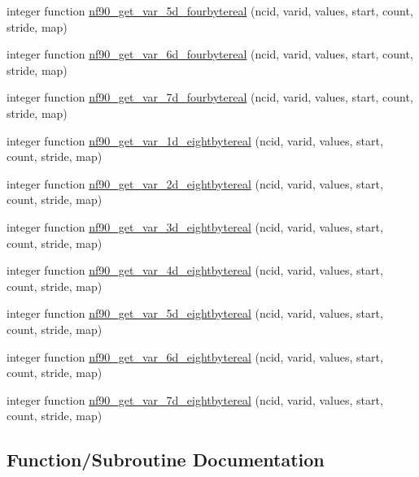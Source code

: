 \begin{DoxyCompactItemize}
\item 
integer function \hyperlink{netcdf__expanded_8f90_aa043d30c1a6946de0a1f3238599dc1ba}{nf90\+\_\+get\+\_\+var\+\_\+5d\+\_\+fourbytereal} (ncid, varid, values, start, count, stride, map)
\item 
integer function \hyperlink{netcdf__expanded_8f90_a4e533b8db3316390515ed2a7b07f571e}{nf90\+\_\+get\+\_\+var\+\_\+6d\+\_\+fourbytereal} (ncid, varid, values, start, count, stride, map)
\item 
integer function \hyperlink{netcdf__expanded_8f90_a7b7c4abd799cbfeebc5d7d8ccd84f484}{nf90\+\_\+get\+\_\+var\+\_\+7d\+\_\+fourbytereal} (ncid, varid, values, start, count, stride, map)
\item 
integer function \hyperlink{netcdf__expanded_8f90_aec28e5c121aacbc48876536b680239a1}{nf90\+\_\+get\+\_\+var\+\_\+1d\+\_\+eightbytereal} (ncid, varid, values, start, count, stride, map)
\item 
integer function \hyperlink{netcdf__expanded_8f90_a12e770f98fbe0667a092e830d92fcd08}{nf90\+\_\+get\+\_\+var\+\_\+2d\+\_\+eightbytereal} (ncid, varid, values, start, count, stride, map)
\item 
integer function \hyperlink{netcdf__expanded_8f90_a6303024b966f78850d884c5acb757da7}{nf90\+\_\+get\+\_\+var\+\_\+3d\+\_\+eightbytereal} (ncid, varid, values, start, count, stride, map)
\item 
integer function \hyperlink{netcdf__expanded_8f90_a49009223043fec3a6e56664363d34b28}{nf90\+\_\+get\+\_\+var\+\_\+4d\+\_\+eightbytereal} (ncid, varid, values, start, count, stride, map)
\item 
integer function \hyperlink{netcdf__expanded_8f90_aae07754ee86547390a27c32217020ea9}{nf90\+\_\+get\+\_\+var\+\_\+5d\+\_\+eightbytereal} (ncid, varid, values, start, count, stride, map)
\item 
integer function \hyperlink{netcdf__expanded_8f90_a038aa337e9320b6b9f44239a30b70bef}{nf90\+\_\+get\+\_\+var\+\_\+6d\+\_\+eightbytereal} (ncid, varid, values, start, count, stride, map)
\item 
integer function \hyperlink{netcdf__expanded_8f90_a4c355b564687b432062f2ba6b851a238}{nf90\+\_\+get\+\_\+var\+\_\+7d\+\_\+eightbytereal} (ncid, varid, values, start, count, stride, map)
\end{DoxyCompactItemize}


\subsection{Function/\+Subroutine Documentation}
\mbox{\label{netcdf__expanded_8f90_aec28e5c121aacbc48876536b680239a1}} 
